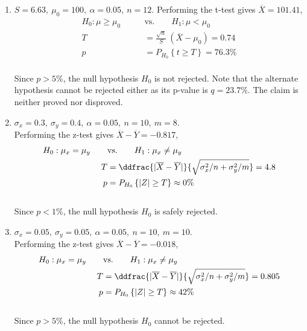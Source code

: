 \begin{enumerate}
	\item $ S = 6.63,\ \mu_0 = 100,\ \alpha = 0.05,\ n = 12$. Performing the t-test gives $ \overline{X} = 101.41 $,\\
	\begin{align}
		H_0 : \mu \geq \mu_0 \qquad &\text{vs.} \qquad H_1 : \mu < \mu_0 \nonumber \\
		T &= \frac{\sqrt{n}}{S}\ (\overline{X} - \mu_0) = 0.74 \nonumber \\
		p &= P_{H_0}\left\{t \geq T\right\} = 76.3\% 
	\end{align}\\
	Since $ p > 5\% $, the null hypothesis $ H_0 $ is not rejected. Note that the alternate hypothesis cannot be rejected either as its p-value is $ q = 23.7\% $. The claim is neither proved nor disproved.\\
	
	\item $ \sigma_x = 0.3,\ \sigma_y = 0.4,\ \alpha = 0.05,\ n = 10,\ m = 8$.\\
	Performing the z-test gives $ \overline{X} - \overline{Y} = -0.817 $,\\
	
	\begin{align}
		H_0 : \mu_x = \mu_y \qquad &\text{vs.} \qquad H_1 : \mu_x \neq \mu_y \nonumber \\
		T &= \ddfrac{| \overline{X} - \overline{Y} |}{\sqrt{\sigma_x^2/n + \sigma_y^2/m}} = 4.8 \nonumber \\
		p &= P_{H_0}\left\{|Z| \geq T\right\} \approx 0 \% 
	\end{align}\\
	Since $ p < 1\% $, the null hypothesis $ H_0 $ is safely rejected.\\
	
	\item $ \sigma_x = 0.05,\ \sigma_y = 0.05,\ \alpha = 0.05,\ n = 10,\ m = 10$.\\
	Performing the z-test gives $ \overline{X} - \overline{Y} = -0.018 $,\\
	
	\begin{align}
		H_0 : \mu_x = \mu_y \qquad &\text{vs.} \qquad H_1 : \mu_x \neq \mu_y \nonumber \\
		T &= \ddfrac{| \overline{X} - \overline{Y} |}{\sqrt{\sigma_x^2/n + \sigma_y^2/m}} = 0.805 \nonumber \\
		p &= P_{H_0}\left\{|Z| \geq T\right\} \approx 42 \% 
	\end{align}\\
	Since $ p > 5\% $, the null hypothesis $ H_0 $ cannot be rejected.\\
	

\end{enumerate}
